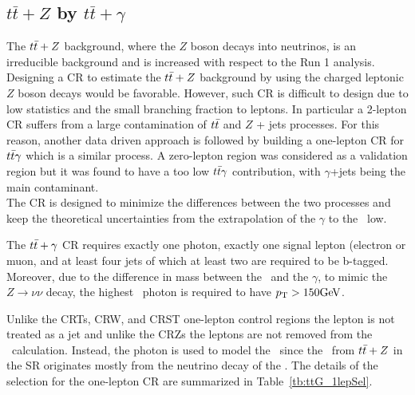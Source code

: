 \subsection{\boldmath$t\bar{t}+Z$ by \boldmath$t\bar{t}+\gamma$}

The $t\bar{t}+Z$ background, where the $Z$ boson decays into neutrinos, is an irreducible background and is increased with respect to the Run 1 analysis. Designing a CR to estimate the $t\bar{t}+Z$ background by using the charged leptonic $Z$ boson decays would be favorable. However, such CR is difficult to design due to low statistics and the small branching fraction to leptons. In particular a 2-lepton CR suffers from a large contamination of $t\bar{t}$ and $Z$ + jets processes. For this reason, another data driven approach is followed by building a one-lepton CR for $t\bar{t}\gamma$ which is a similar process. A zero-lepton region was considered as a validation region but it was found to have a too low $t\bar{t}\gamma$ contribution, with $\gamma$+jets being the main contaminant.\\

The CR is designed to minimize the differences between the two processes and keep the theoretical uncertainties from the extrapolation of the $\gamma$ to the \Zboson\ low. 

The $t\bar{t}+\gamma$ CR requires exactly one photon, exactly one signal lepton (electron or muon, and at least four jets of which at least two are required to be b-tagged. Moreover, due to the difference in mass between the \Zboson\ and the $\gamma$, to mimic the $Z \rightarrow \nu\nu$ decay, the highest \pT\ photon is required to have $\pt>150\gev$. 

Unlike the CRTs, CRW, and CRST one-lepton control regions the lepton is not treated as a jet and unlike the CRZs the leptons are not removed from the \met\ calculation. Instead, the photon is used to model the \met\ since the \met\ from $t\bar{t}+Z$ in the SR originates mostly from the neutrino decay of the \Zboson. 
The details of the selection for the one-lepton CR are summarized in Table~\ref{tb:ttG_1lepSel}.

